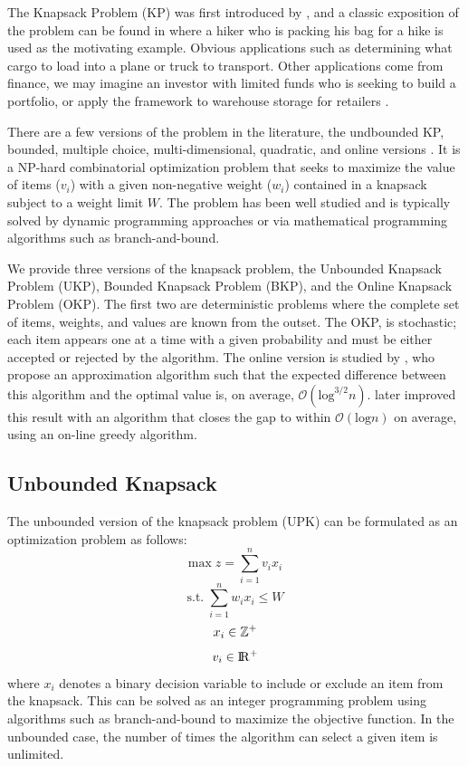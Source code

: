 \documentclass[12pt]{article}
\begin{document}
The Knapsack Problem (KP) was first introduced by \citet{Mathews1896}, and a classic exposition of the problem can be found in \citet{Dantzig1957} where a hiker who is packing his bag for a hike is used as the motivating example.
Obvious applications such as determining what cargo to load into a plane or truck to transport.
Other applications come from finance, we may imagine an investor with limited funds who is seeking to build a portfolio, or apply the framework to warehouse storage for retailers \citep{Ma2019}.

There are a few versions of the problem in the literature, the undbounded KP, bounded, multiple choice, multi-dimensional, quadratic, and online versions \citep{Kellerer2004}.
It is a NP-hard combinatorial optimization problem that seeks to maximize the value of items ($v_i$) with a given non-negative weight ($w_i$) contained in a knapsack subject to a weight limit $W$. 
The problem has been well studied and is typically solved by dynamic programming approaches or via mathematical programming algorithms such as branch-and-bound.

We provide three versions of the knapsack problem, the Unbounded Knapsack Problem (UKP), Bounded Knapsack Problem (BKP), and the Online Knapsack Problem (OKP). 
The first two are deterministic problems where the complete set of items, weights, and values are known from the outset. 
The OKP, is stochastic; each item appears one at a time with a given probability and must be either accepted or rejected by the algorithm.
The online version is studied by \citet{Marchetti-Spaccamela1995}, who propose an approximation algorithm such that the expected difference between this algorithm and the optimal value is, on average, $\mathcal{O}(\textrm{log}^{3/2}n)$. \citet{Lueker1995} later improved this result with an algorithm that closes the gap to within $\mathcal{O}(\textrm{log}n)$ on average, using an on-line greedy algorithm.


\subsection{Unbounded Knapsack}

The unbounded version of the knapsack problem (UPK) can be formulated as an optimization problem as follows:
%
\begin{equation}
\textrm{max} \; z = \sum_{i=1}^n v_i x_i
\end{equation}
%
\begin{equation}
\textrm{s.t.} \; \sum_{i=1}^n w_i x_i \leq W
\end{equation}
%
\begin{equation}
x_i \in \rm \mathbb{Z}^+
\end{equation}
%
\begin{equation}
v_i \in \rm I\!R^+
\end{equation}
%
where $x_i$ denotes a binary decision variable to include or exclude an item from the knapsack. 
This can be solved as an integer programming problem using algorithms such as branch-and-bound to maximize the objective function. 
In the unbounded case, the number of times the algorithm can select a given item is unlimited.
\end{document}
